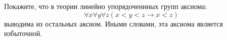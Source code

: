 Покажите, что в теории линейно упорядоченнных групп аксиома:
$$
    \forall x \forall y \forall z (x < y < z \rightarrow x < z)
$$
выводима из остальных аксиом. Иными словами, эта аксиома является избыточной.